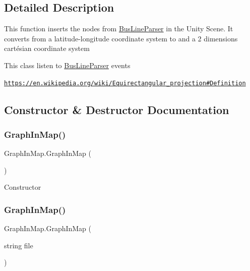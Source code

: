\subsection{Detailed Description}
This function inserts the nodes from {\ttfamily \hyperlink{classBusLineParser}{Bus\+Line\+Parser}} in the Unity Scene. It converts from a latitude-\/longitude coordinate system to and a 2 dimensions cartésian coordinate system 

This class listen to {\ttfamily \hyperlink{classBusLineParser}{Bus\+Line\+Parser}} events

\href{https://en.wikipedia.org/wiki/Equirectangular_projection#Definition}{\tt https\+://en.\+wikipedia.\+org/wiki/\+Equirectangular\+\_\+projection\#\+Definition}

\subsection{Constructor \& Destructor Documentation}
\mbox{\label{classGraphInMap_ae90bf398b6c8d18784d8d01f28ad1da0}} 
\subsubsection{\texorpdfstring{Graph\+In\+Map()}{GraphInMap()}\hspace{0.1cm}{\footnotesize\ttfamily [1/2]}}
{\footnotesize\ttfamily Graph\+In\+Map.\+Graph\+In\+Map (\begin{DoxyParamCaption}{ }\end{DoxyParamCaption})\hspace{0.3cm}{\ttfamily [inline]}}



Constructor 

\mbox{\label{classGraphInMap_ac9b024f6f816f9451702f1b9a829aa0a}} 
\subsubsection{\texorpdfstring{Graph\+In\+Map()}{GraphInMap()}\hspace{0.1cm}{\footnotesize\ttfamily [2/2]}}
{\footnotesize\ttfamily Graph\+In\+Map.\+Graph\+In\+Map (\begin{DoxyParamCaption}\item[{string}]{file }\end{DoxyParamCaption})\hspace{0.3cm}{\ttfamily [inline]}}



